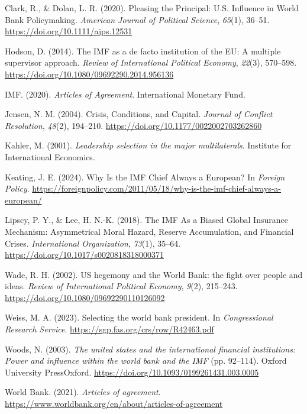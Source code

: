 \documentclass[
  letterpaper,
  abstract=true]{scrartcl}
\newlength{\cslhangindent}
\newlength{\cslentryspacingunit} %
\newenvironment{CSLReferences}[2] %
 {%
  \setlength{\parindent}{0pt}
  \ifodd #1
  \let\oldpar\par
  \def\par{\hangindent=\cslhangindent\oldpar}
  \fi
  \setlength{\parskip}{#2\cslentryspacingunit}
 }%
 {}
\begin{document}
\hypertarget{refs}{}
\begin{CSLReferences}{1}{0}
\leavevmode{}%
Clark, R., \& Dolan, L. R. (2020). Pleasing the Principal: U.S.
Influence in World Bank Policymaking. \emph{American Journal of
Political Science}, \emph{65}(1), 36--51.
\url{https://doi.org/10.1111/ajps.12531}

\leavevmode{}%
Hodson, D. (2014). The IMF as a de facto institution of the EU: A
multiple supervisor approach. \emph{Review of International Political
Economy}, \emph{22}(3), 570--598.
\url{https://doi.org/10.1080/09692290.2014.956136}

\leavevmode{}%
IMF. (2020). \emph{{Articles} of {Agreement}}. International Monetary
Fund.

\leavevmode{}%
Jensen, N. M. (2004). Crisis, Conditions, and Capital. \emph{Journal of
Conflict Resolution}, \emph{48}(2), 194--210.
\url{https://doi.org/10.1177/0022002703262860}

\leavevmode{}%
Kahler, M. (2001). \emph{Leadership selection in the major
multilaterals}. Institute for International Economics.

\leavevmode{}%
Keating, J. E. (2024). Why {Is} the {IMF} {Chief} {Always} a {European}?
In \emph{Foreign Policy}.
\url{https://foreignpolicy.com/2011/05/18/why-is-the-imf-chief-always-a-european/}

\leavevmode{}%
Lipscy, P. Y., \& Lee, H. N.-K. (2018). The IMF As a Biased Global
Insurance Mechanism: Asymmetrical Moral Hazard, Reserve Accumulation,
and Financial Crises. \emph{International Organization}, \emph{73}(1),
35--64. \url{https://doi.org/10.1017/s0020818318000371}

\leavevmode{}%
Wade, R. H. (2002). US hegemony and the World Bank: the fight over
people and ideas. \emph{Review of International Political Economy},
\emph{9}(2), 215--243. \url{https://doi.org/10.1080/09692290110126092}

\leavevmode{}%
Weiss, M. A. (2023). Selecting the world bank president. In
\emph{Congressional Research Service}.
\url{https://sgp.fas.org/crs/row/R42463.pdf}

\leavevmode{}%
Woods, N. (2003). \emph{The united states and the international
financial institutions: Power and influence within the world bank and
the IMF} (pp. 92--114). Oxford University PressOxford.
\url{https://doi.org/10.1093/0199261431.003.0005}

\leavevmode{}%
World Bank. (2021). \emph{Articles of agreement}.
\url{https://www.worldbank.org/en/about/articles-of-agreement}

\end{CSLReferences}
\end{document}
